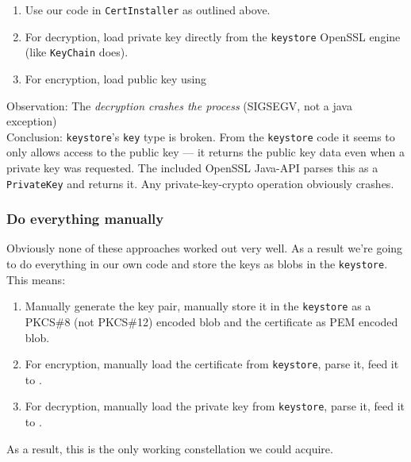 \documentclass[a4paper,draft]{scrartcl}
\begin{document}
			\begin{enumerate}
				\item Use our code in \texttt{CertInstaller} as outlined above.
				\item For decryption, load private key directly from the \texttt{keystore} OpenSSL engine (like \texttt{KeyChain} does).
				\item For encryption, load public key using 
			\end{enumerate}
			Observation:
			The \emph{decryption crashes the process} (SIGSEGV, not a java exception)\\
			Conclusion:
			\texttt{keystore}'s \texttt{key} type is broken. From the \texttt{keystore} code it seems to only allows access to the public key --- it returns the public key data even when a private key was requested. The included OpenSSL Java-API parses this as a \texttt{PrivateKey} and returns it. Any private-key-crypto operation obviously crashes.

		\subsubsection{Do everything manually}
			Obviously none of these approaches worked out very well. As a result we're going to do everything in our own code and store the keys as blobs in the \texttt{keystore}. This means:
			\begin{enumerate}
				\item Manually generate the key pair, manually store it in the \texttt{keystore} as a PKCS\#8 (not PKCS\#12) encoded blob and the certificate as PEM encoded blob.
				\item For encryption, manually load the certificate from \texttt{keystore}, parse it, feed it to .
				\item For decryption, manually load the private key from \texttt{keystore}, parse it, feed it to .
			\end{enumerate}
			As a result, this is the only working constellation we could acquire.
\end{document}
